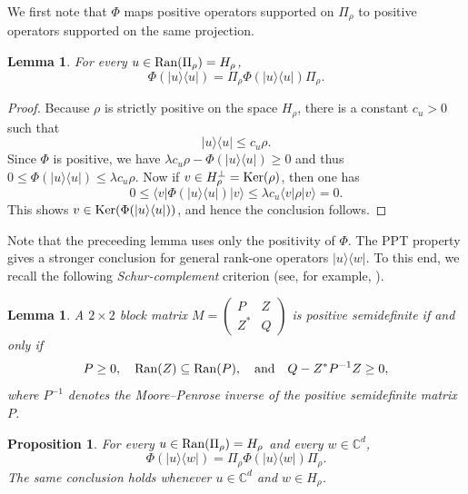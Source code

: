 \documentclass[11pt,reqno]{amsart}
\newtheorem{proposition}[theorem]{Proposition}
\newtheorem{lemma}[theorem]{Lemma}
\theoremstyle{definition}
\theoremstyle{definition}
\theoremstyle{definition}
\theoremstyle{definition}
\newcommand{\la}{\langle}
\newcommand{\ra}{\rangle}
\newcommand{\Comp}{\mathbb{C}}
\newcommand{\proj}[1]{|#1\rangle\langle #1|}
\begin{document}
We first note that $\Phi$ maps positive operators supported on $\Pi_{\rho}$ to positive operators supported on the same projection.

\begin{lemma}\label{lem:diagonal-support-propagation}
For every $u\in {\rm Ran}(\Pi_{\rho}) = H_{\rho}$,
    $$\Phi(\proj{u})=\Pi_{\rho} \Phi(\proj{u}) \Pi_{\rho}.$$
\end{lemma}

\begin{proof}
Because $\rho$ is strictly positive on the space $H_{\rho}$, there is a constant
$c_u>0$ such that
    $$\proj{u}\leq  c_u\rho.$$
Since $\Phi$ is positive, we have $\lambda c_u\rho - \Phi(|u\ra\la u|)\geq 0$ and thus $0\leq \Phi(|u\ra\la u|)\leq \lambda c_u\rho$. Now if $v\in H_{\rho}^{\perp} = {\rm Ker}(\rho)$, then one has
    $$0\leq \la v|\Phi(|u\ra\la u|)|v\ra \leq \lambda c_u \la v|\rho|v\ra = 0.$$
This shows $v\in {\rm Ker}(\Phi(|u\ra\la u|))$, and hence the conclusion follows.
\end{proof}

Note that the preceeding lemma uses only the positivity of $\Phi$. The PPT property gives a stronger conclusion for general rank-one operators $|u\ra\la w|$. To this end, we recall the following \emph{Schur-complement} criterion (see, for example, \cite[Chapter~1]{Zha05}).

\begin{lemma}
\label{lem:SchurComp}
A $2\times 2$ block matrix $M=\begin{pmatrix}P&Z\\ Z^*&Q\end{pmatrix}$
is positive semidefinite if and only if
    $$P\geq 0, \quad {\rm Ran}(Z)\subseteq {\rm Ran}(P), \quad \text{and} \quad Q-Z^*P^{-1}Z\geq 0,$$
where $P^{-1}$ denotes the \emph{Moore--Penrose inverse} of the positive semidefinite matrix $P$. 
\end{lemma}

\begin{proposition}\label{prop:two-sided-support}
For every $u\in {\rm Ran}(\Pi_{\rho}) = H_{\rho}$ and every $w\in\Comp^d$,
    $$\Phi(|u\ra\la w|)
 =\Pi_{\rho}\Phi(|u\ra\la w|)\Pi_{\rho}.$$
The same conclusion holds whenever $u\in \Comp^d$ and $w\in H_{\rho}$.
\end{proposition}
\end{document}
